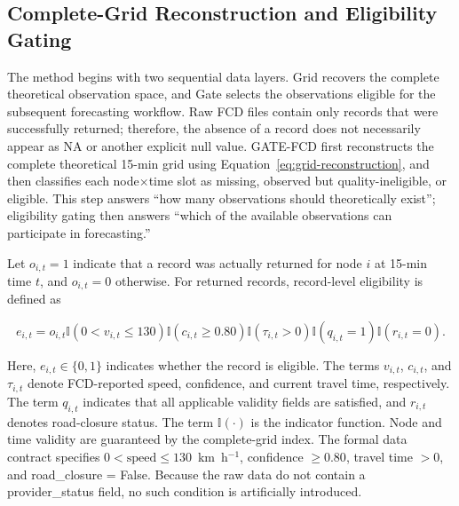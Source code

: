\documentclass[pdflatex,sn-mathphys-num,iicol]{sn-jnl}
\begin{document}
\FloatBarrier

\subsection{Complete-Grid Reconstruction and Eligibility Gating}
\label{subsec:grid-gating}

The method begins with two sequential data layers. Grid recovers the complete theoretical observation space, and Gate selects the observations eligible for the subsequent forecasting workflow. Raw FCD files contain only records that were successfully returned; therefore, the absence of a record does not necessarily appear as NA or another explicit null value. GATE-FCD first reconstructs the complete theoretical 15-min grid using Equation~\ref{eq:grid-reconstruction}, and then classifies each node$\times$time slot as missing, observed but quality-ineligible, or eligible. This step answers ``how many observations should theoretically exist''; eligibility gating then answers ``which of the available observations can participate in forecasting.''

Let $o_{i,t}=1$ indicate that a record was actually returned for node $i$ at 15-min time $t$, and $o_{i,t}=0$ otherwise. For returned records, record-level eligibility is defined as

\begin{equation}
e_{i,t}
=
o_{i,t}
\mathbb{I}\!\left(0<v_{i,t}\leq130\right)
\mathbb{I}\!\left(c_{i,t}\geq0.80\right)
\mathbb{I}\!\left(\tau_{i,t}>0\right)
\mathbb{I}\!\left(q_{i,t}=1\right)
\mathbb{I}\!\left(r_{i,t}=0\right).
\label{eq:record-eligibility}
\end{equation}

Here, $e_{i,t}\in\{0,1\}$ indicates whether the record is eligible. The terms $v_{i,t}$, $c_{i,t}$, and $\tau_{i,t}$ denote FCD-reported speed, confidence, and current travel time, respectively. The term $q_{i,t}$ indicates that all applicable validity fields are satisfied, and $r_{i,t}$ denotes road-closure status. The term $\mathbb{I}(\cdot)$ is the indicator function. Node and time validity are guaranteed by the complete-grid index. The formal data contract specifies $0<\mathrm{speed}\leq130$~km~h$^{-1}$, confidence $\geq0.80$, travel time $>0$, and road\_closure = False. Because the raw data do not contain a provider\_status field, no such condition is artificially introduced.
\end{document}
